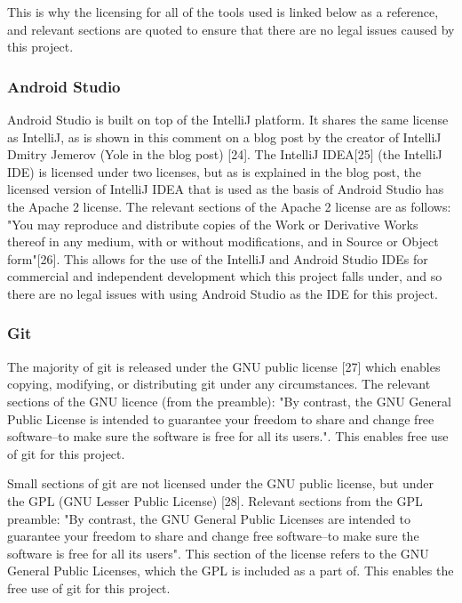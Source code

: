 \documentclass{article}
\begin{document}
This is why the licensing for all of the tools used is linked below as a reference, and relevant sections are quoted to ensure that there are no legal issues caused by this project. \par

\subsubsection{Android Studio}

Android Studio is built on top of the IntelliJ platform. It shares the same license as IntelliJ, as is shown in this comment on a blog post by the creator of IntelliJ Dmitry Jemerov (Yole in the blog post) [24]. The IntelliJ IDEA[25] (the IntelliJ IDE) is licensed under two licenses, but as is explained in the blog post, the licensed version of IntelliJ IDEA that is used as the basis of Android Studio has the Apache 2 license. The relevant sections of the Apache 2 license are as follows: "You may reproduce and distribute copies of the Work or Derivative Works thereof in any medium, with or without modifications, and in Source or Object form"[26]. This allows for the use of the IntelliJ and Android Studio IDEs for commercial and independent development which this project falls under, and so there are no legal issues with using Android Studio as the IDE for this project. \par

\subsubsection{Git}

The majority of git is released under the GNU public license [27] which enables copying, modifying, or distributing git under any circumstances. The relevant sections of the GNU licence (from the preamble): "By contrast, the GNU General Public License is intended to guarantee your freedom to share and change free software--to make sure the software is free for all its users.". This enables free use of git for this project. \par

Small sections of git are not licensed under the GNU public license, but under the GPL (GNU Lesser Public License) [28]. Relevant sections from the GPL preamble: "By contrast, the GNU General Public Licenses are intended to guarantee your freedom to share and change free software--to make sure the software is free for all its users". This section of the license refers to the GNU General Public Licenses, which the GPL is included as a part of. This enables the free use of git for this project. \par
\end{document}
